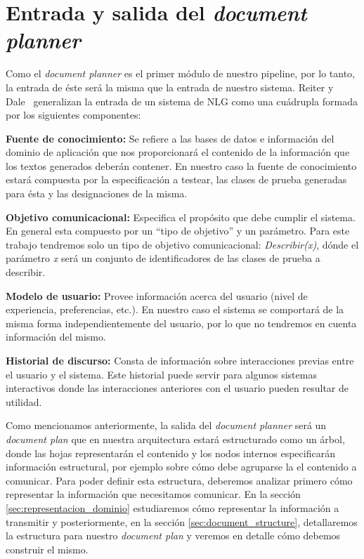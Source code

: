 \section{Entrada y salida del \textit{document planner}}
Como el \textit{document planner} es el primer módulo de nuestro pipeline, por lo tanto, la entrada de éste será la misma que la entrada de nuestro sistema. Reiter y Dale~\cite{reiter_dale} generalizan la entrada de un sistema de NLG  como una cuádrupla formada por los siguientes componentes:

\bigskip
\noindent
\textbf{Fuente de conocimiento:} Se refiere a las bases de datos e información del dominio de aplicación que nos proporcionará el contenido de la información que los textos generados deberán contener.
En nuestro caso la fuente de conocimiento estará compuesta por la especificación a testear, las clases de prueba generadas para ésta y las designaciones de la misma. 

\bigskip
\noindent
\textbf{Objetivo comunicacional:} Especifica el propósito que debe cumplir el sistema. En general esta compuesto por un ``tipo de objetivo'' y un parámetro.
Para este trabajo tendremos solo un tipo de objetivo comunicacional: \emph{Describir(x)}, dónde el parámetro \emph{x} será un conjunto de identificadores de las clases de prueba a describir.

\bigskip
\noindent
\textbf{Modelo de usuario:} Provee información acerca del usuario (nivel de experiencia, preferencias, etc.). En nuestro caso el sistema se comportará de la misma forma independientemente del usuario, por lo que no tendremos en cuenta información del mismo.

\bigskip
\noindent
\textbf{Historial de discurso:} Consta de información sobre interacciones previas entre el usuario y el sistema. Este historial puede servir para algunos sistemas interactivos donde las interacciones anteriores con el usuario pueden resultar de utilidad. 

\bigskip
Como mencionamos anteriormente, la salida del \textit{document planner} será un \textit{document plan} que en nuestra arquitectura estará estructurado como un árbol, donde las hojas representarán el contenido y los nodos internos especificarán información estructural, por ejemplo sobre cómo debe agruparse la el contenido a comunicar. Para poder definir esta estructura, deberemos analizar primero cómo representar la información que necesitamos comunicar. En la sección \ref{sec:representacion_dominio} estudiaremos cómo representar la información a transmitir y posteriormente, en la sección \ref{sec:document_structure}, detallaremos la estructura para nuestro \emph{document plan} y veremos en detalle cómo debemos construir el mismo.

